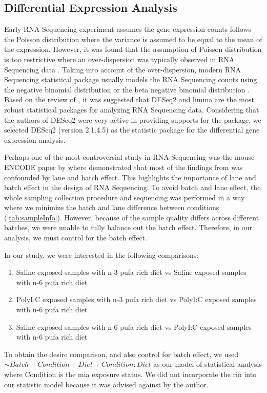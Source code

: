 \subsection{Differential Expression Analysis}
Early RNA Sequencing experiment assumes the gene expression counts follows the Poisson distribution \citep{Marioni2008} where the variance is assumed to be equal to the mean of the expression.
However, it was found that the assumption of Poisson distribution is too restrictive where an over-dispersion was typically observed in RNA Sequencing data \citep{Anders2010}.
Taking into account of the over-dispersion, modern RNA Sequencing statistical package usually models the RNA Sequencing counts using the negative binomial distribution \citep{Anders2010,Robinson2010} or the beta negative binomial distribution \citep{Trapnell2012}.
Based on the review of \citet{Seyednasrollah2015}, it was suggested that DESeq2 and limma are the most robust statistical packages for analyzing RNA Sequencing data. 
Considering that the authors of DESeq2 were very active in providing supports for the package, we selected DESeq2 (version 2.1.4.5) \citep{Love2014} as the statistic package for the differential gene expression analysis.

Perhaps one of the most controversial study in RNA Sequencing was the mouse ENCODE paper by \citet{Yue2014} where \citet{Gilad2015} demonstrated that most of the findings from \citet{Yue2014} was confounded by lane and batch effect.
This highlights the importance of lane and batch effect in the design of RNA Sequencing.
To avoid batch and lane effect, the whole sampling collection procedure and sequencing was performed in a way where we minimize the batch and lane difference between conditions (\cref{tab:sampleInfo}). 
However, because of the sample quality differs across different batches, we were unable to fully balance out the batch effect. 
Therefore, in our analysis, we must control for the batch effect.

In our study, we were interested in the following comparisons:
\begin{enumerate}
	\item Saline exposed samples with n-3 \gls{pufa} rich diet vs Saline exposed samples with n-6 \gls{pufa} rich diet 
	\item PolyI:C exposed samples with n-3 \gls{pufa} rich diet vs PolyI:C exposed samples with n-6 \gls{pufa} rich diet 
	\item Saline exposed samples with n-6 \gls{pufa} rich diet vs PolyI:C exposed samples with n-6 \gls{pufa} rich diet 
\end{enumerate}
To obtain the desire comparison, and also control for batch effect, we used $\sim Batch+Condition+Diet+Condition:Diet$ as our model of statistical analysis where Condition is the \gls{mia} exposure status.
We did not incorporate the \gls{rin} into our statistic model because it was advised against by the author.

